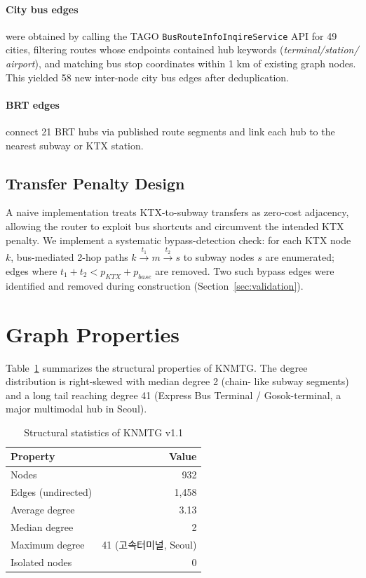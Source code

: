 \documentclass[12pt]{article}
\begin{document}
\paragraph{City bus edges} were obtained by calling the TAGO
\texttt{BusRouteInfoInqireService} API for 49 cities, filtering routes
whose endpoints contained hub keywords (\textit{terminal/station/
airport}), and matching bus stop coordinates within 1 km of existing
graph nodes. This yielded 58 new inter-node city bus edges after
deduplication.

\paragraph{BRT edges} connect 21 BRT hubs via published route segments
and link each hub to the nearest subway or KTX station.

\subsection{Transfer Penalty Design}

A naive implementation treats KTX-to-subway transfers as zero-cost
adjacency, allowing the router to exploit bus shortcuts and circumvent
the intended KTX penalty. We implement a systematic bypass-detection
check: for each KTX node $k$, bus-mediated 2-hop paths
$k \xrightarrow{t_1} m \xrightarrow{t_2} s$ to subway nodes $s$ are
enumerated; edges where $t_1 + t_2 < p_{KTX} + p_{base}$ are removed.
Two such bypass edges were identified and removed during construction
(Section~\ref{sec:validation}).

\section{Graph Properties}

Table~\ref{tab:stats} summarizes the structural properties of KNMTG.
The degree distribution is right-skewed with median degree 2 (chain-
like subway segments) and a long tail reaching degree 41 (Express Bus
Terminal / Gosok-terminal, a major multimodal hub in Seoul).

\begin{table}[h]
\centering
\caption{Structural statistics of KNMTG v1.1}
\label{tab:stats}
\begin{tabular}{lr}
\toprule
Property & Value \\
\midrule
Nodes & 932 \\
Edges (undirected) & 1,458 \\
Average degree & 3.13 \\
Median degree & 2 \\
Maximum degree & 41 (고속터미널, Seoul) \\
Isolated nodes & 0 \\
\bottomrule
\end{tabular}
\end{table}
\end{document}
